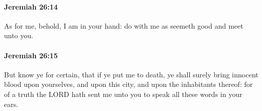 		\paragraph{Jeremiah 26:14} %
			\label{JEREMIAH-26-14}

			As for me, behold, I am in your hand: do with me as seemeth good and meet unto you.


		\paragraph{Jeremiah 26:15} %
			\label{JEREMIAH-26-15}

			But know ye for certain, that if ye put me to death, ye shall surely bring innocent blood upon yourselves, and upon this city, and upon the inhabitants thereof: for of a truth the LORD hath sent me unto you to speak all these words in your ears.



